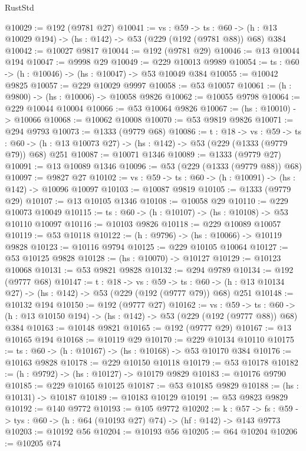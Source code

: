 \begin{lexlean}{RustStd}
\begin{coremodule}
@10029 := @192 (@9781 @27)
@10041 := {vs : @59} ->
  {ts : @60} -> (h : @13 @10029 @194) -> (hs : @142) -> @53 (@229 (@192 (@9781 @88)) @68) @384
@10042 := @10027 @9817
@10044 := @192 (@9781 @29)
@10046 := @13 @10044 @194
@10047 := @9998 @29
@10049 := @229 @10013 @9989
@10054 := {ts : @60} -> (h : @10046) -> (hs : @10047) -> @53 @10049 @384
@10055 := @10042 @9825
@10057 := @229 @10029 @9997
@10058 := @53 @10057
@10061 := (h : @9800) -> (hs : @10006) -> @10058 @9826
@10062 := @10055 @9798
@10064 := @229 @10044 @10004
@10066 := @53 @10064 @9826
@10067 := (hs : @10010) -> @10066
@10068 := @10062 @10008
@10070 := @53 @9819 @9826
@10071 := @294 @9793
@10073 := @1333 (@9779 @68)
@10086 := {t : @18} ->
  {vs : @59} ->
  {ts : @60} -> (h : @13 @10073 @27) -> (hs : @142) -> @53 (@229 (@1333 (@9779 @79)) @68) @251
@10087 := @10071 @1346
@10089 := @1333 (@9779 @27)
@10091 := @13 @10089 @1346
@10096 := @53 (@229 (@1333 (@9779 @88)) @68)
@10097 := @9827 @27
@10102 := {vs : @59} -> {ts : @60} -> (h : @10091) -> (hs : @142) -> @10096 @10097
@10103 := @10087 @9819
@10105 := @1333 (@9779 @29)
@10107 := @13 @10105 @1346
@10108 := @10058 @29
@10110 := @229 @10073 @10049
@10115 := {ts : @60} -> (h : @10107) -> (hs : @10108) -> @53 @10110 @10097
@10116 := @10103 @9826
@10118 := @229 @10089 @10057
@10119 := @53 @10118
@10122 := (h : @9796) -> (hs : @10066) -> @10119 @9828
@10123 := @10116 @9794
@10125 := @229 @10105 @10064
@10127 := @53 @10125 @9828
@10128 := (hs : @10070) -> @10127
@10129 := @10123 @10068
@10131 := @53 @9821 @9828
@10132 := @294 @9789
@10134 := @192 (@9777 @68)
@10147 := {t : @18} ->
  {vs : @59} ->
  {ts : @60} -> (h : @13 @10134 @27) -> (hs : @142) -> @53 (@229 (@192 (@9777 @79)) @68) @251
@10148 := @10132 @194
@10150 := @192 (@9777 @27)
@10162 := {vs : @59} ->
  {ts : @60} -> (h : @13 @10150 @194) -> (hs : @142) -> @53 (@229 (@192 (@9777 @88)) @68) @384
@10163 := @10148 @9821
@10165 := @192 (@9777 @29)
@10167 := @13 @10165 @194
@10168 := @10119 @29
@10170 := @229 @10134 @10110
@10175 := {ts : @60} -> (h : @10167) -> (hs : @10168) -> @53 @10170 @384
@10176 := @10163 @9828
@10178 := @229 @10150 @10118
@10179 := @53 @10178
@10182 := (h : @9792) -> (hs : @10127) -> @10179 @9829
@10183 := @10176 @9790
@10185 := @229 @10165 @10125
@10187 := @53 @10185 @9829
@10188 := (hs : @10131) -> @10187
@10189 := @10183 @10129
@10191 := @53 @9823 @9829
@10192 := @140 @9772
@10193 := @105 @9772
@10202 := {k : @57} ->
  {fs : @59} -> {tys : @60} -> (h : @64 (@10193 @27) @74) -> (hf : @142) -> @143 @9773
@10203 := @10192 @56
@10204 := @10193 @56
@10205 := @64 @10204
@10206 := @10205 @74

\end{coremodule}
\end{lexlean}
